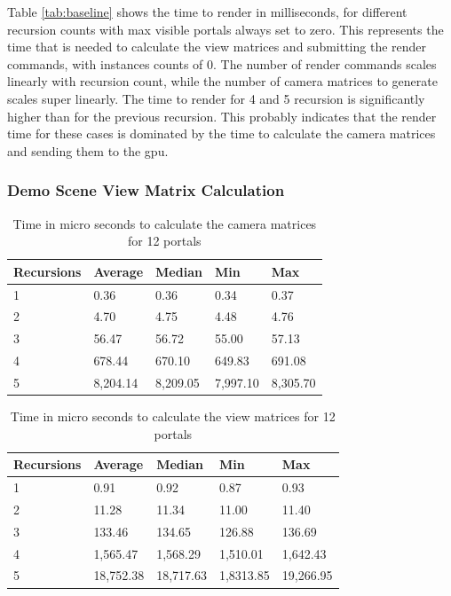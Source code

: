Table \ref{tab:baseline} shows the time to render in milliseconds, for different recursion counts with max visible portals always set to zero. This represents the time that is needed to calculate the view matrices and submitting the render commands, with instances counts of 0. The number of render commands scales linearly with recursion count, while the number of camera matrices to generate scales super linearly. The time to render for 4 and 5 recursion is significantly higher than for the previous recursion. This probably indicates that the render time for these cases is dominated by the time to calculate the camera matrices and sending them to the \gls{gpu}.

\subsubsection{Demo Scene View Matrix Calculation}
\label{section:perfmatrixcalc}

\begin{table}[H]
	\centering
	\label{tab:cameramatricecalc}
	\begin{tabular}{|l|l|l|l|l|}
		\hline
		Recursions & Average & Median  & Min     & Max     \\ \hline
		1          & 0.36    & 0.36    & 0.34    & 0.37    \\ \hline
		2          & 4.70    & 4.75    & 4.48    & 4.76    \\ \hline
		3          & 56.47   & 56.72   & 55.00   & 57.13   \\ \hline
		4          & 678.44  & 670.10  & 649.83  & 691.08  \\ \hline
		5          & 8,204.14 & 8,209.05 & 7,997.10 & 8,305.70\\ \hline
	\end{tabular}
	\caption{Time in micro seconds to calculate the camera matrices for 12 portals}
\end{table}

\begin{table}[H]
	\centering
	\label{tab:cameramatricecalcinverse}
	\begin{tabular}{|l|l|l|l|l|}
		\hline
		Recursions & Average   & Median  	& Min     	& Max        \\ \hline
		1          & 0.91      & 0.92		& 0.87    	& 0.93       \\ \hline
		2          & 11.28     & 11.34		& 11.00    	& 11.40      \\ \hline
		3          & 133.46    & 134.65		& 126.88   	& 136.69     \\ \hline
		4          & 1,565.47  & 1,568.29	& 1,510.01  & 1,642.43   \\ \hline
		5          & 18,752.38 & 18,717.63	& 1,8313.85 & 19,266.95 \\ \hline
	\end{tabular}
	\caption{Time in micro seconds to calculate the view matrices for 12 portals}
\end{table}

